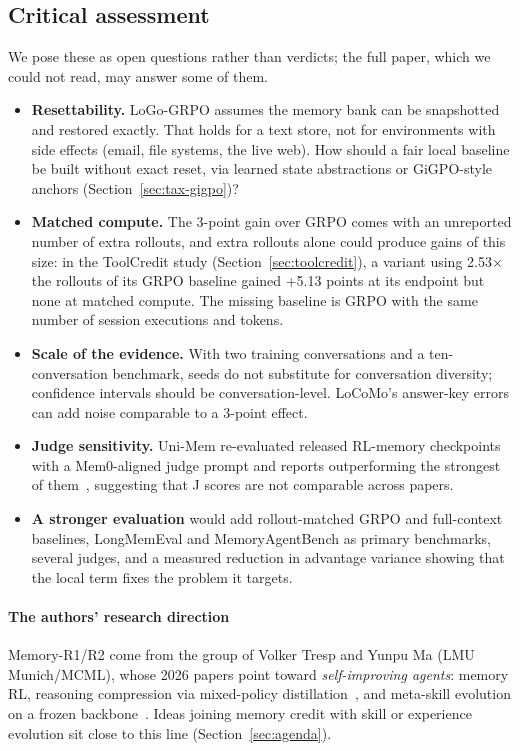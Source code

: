 \subsection{Critical assessment}\label{sec:memory-critique}
We pose these as open questions rather than verdicts; the full paper, which we could not read, may answer some of them.
\begin{itemize}
\item \textbf{Resettability.} LoGo-GRPO assumes the memory bank can be snapshotted and restored exactly. That holds for a text store, not for environments with side effects (email, file systems, the live web). How should a fair local baseline be built without exact reset, \eg via learned state abstractions or GiGPO-style anchors (Section~\ref{sec:tax-gigpo})?
\item \textbf{Matched compute.} The 3-point gain over GRPO comes with an unreported number of extra rollouts, and extra rollouts alone could produce gains of this size: in the ToolCredit study (Section~\ref{sec:toolcredit}), a variant using 2.53$\times$ the rollouts of its GRPO baseline gained +5.13 points at its endpoint but none at matched compute. The missing baseline is GRPO with the same number of session executions and tokens.
\item \textbf{Scale of the evidence.} With two training conversations and a ten-conversation benchmark, seeds do not substitute for conversation diversity; confidence intervals should be conversation-level. LoCoMo's answer-key errors can add noise comparable to a 3-point effect.
\item \textbf{Judge sensitivity.} Uni-Mem re-evaluated released RL-memory checkpoints with a Mem0-aligned judge prompt and reports outperforming the strongest of them~\citep{unimem2026}, suggesting that J scores are not comparable across papers.
\item \textbf{A stronger evaluation} would add rollout-matched GRPO and full-context baselines, LongMemEval and MemoryAgentBench as primary benchmarks, several judges, and a measured reduction in advantage variance showing that the local term fixes the problem it targets.
\end{itemize}

\paragraph{The authors' research direction}
Memory-R1/R2 come from the group of Volker Tresp and Yunpu Ma (LMU Munich/MCML\unverified), whose 2026 papers point toward \emph{self-improving agents}: memory RL, reasoning compression via mixed-policy distillation~\citep{yang2026reasoning}, and meta-skill evolution on a frozen backbone~\citep{wang2026metaskill}. Ideas joining memory credit with skill or experience evolution sit close to this line (Section~\ref{sec:agenda}).
